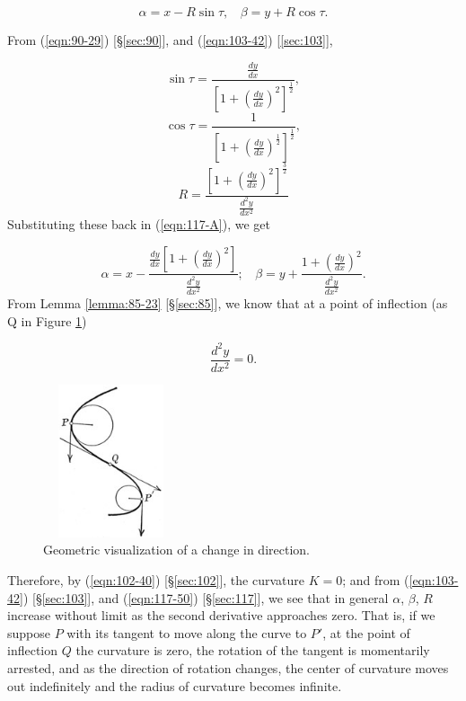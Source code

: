 \begin{equation}
\label{eqn:117-A}
\alpha = x -R\sin \tau,\ \ \ \ \beta = y + R\cos \tau.
\end{equation}

From (\ref{eqn:90-29}) [\S \ref{sec:90}], and (\ref{eqn:103-42})
[\ref{sec:103}],

\[
\sin \tau 
= \frac{ \frac{dy}{dx} }{ \left[ 1 
+ \left( \frac{dy}{dx} \right)^2 \right]^{\frac{1}{2}} }, 
\]
\[
\cos \tau 
= \frac{1}{\left[ 1 + 
\left( \frac{dy}{dx} \right)^{\frac{1}{2}} \right]^{\frac{1}{2}}}, 
\]
\[
R = \frac{ \left[ 1 
+ \left( \frac{dy}{dx} \right)^2 \right]^{\frac{3}{2}} }{ \frac{d^2 y}{dx^2} }
\]
Substituting these back in (\ref{eqn:117-A}), we get

\begin{equation}
\label{eqn:117-50}
\alpha = x - \frac{ \frac{dy}{dx}\left[ 1 + \left( \frac{dy}{dx} \right)^2 \right] }{\frac{d^2 y}{dx^2}}; 
\ \ \ \ 
\beta = y + \frac{1 + \left( \frac{dy}{dx} \right)^2}{\frac{d^2 y}{dx^2}}.
\end{equation}
From Lemma \ref{lemma:85-23} [\S \ref{sec:85}], we know that at a 
point of inflection (as Q in Figure \ref{fig:circle-of-curvature2})

\[
    \frac{d^2 y}{dx^2} = 0.
\]

\begin{figure}[h!]
\begin{minipage}{\textwidth}
\begin{center}
\includegraphics[height=4.5cm,width=4cm]{circle-of-curvature2.eps}
\end{center}
\end{minipage}
\caption{Geometric visualization of a change in direction.}
\label{fig:circle-of-curvature2}
\end{figure}

\noindent
Therefore, by (\ref{eqn:102-40}) [\S \ref{sec:102}], the curvature 
$K = 0$; and from (\ref{eqn:103-42}) [\S \ref{sec:103}], 
and (\ref{eqn:117-50}) [\S \ref{sec:117}], we see that in general 
$\alpha$, $\beta$, $R$ increase without limit as the second 
derivative approaches zero. That is, if we suppose $P$ with its 
tangent to move along the curve to $P'$, at the point of 
inflection $Q$ the curvature is zero, the rotation of the tangent 
is momentarily arrested, and as the direction of rotation changes, 
the center of curvature moves out indefinitely and the radius 
of curvature becomes infinite.


